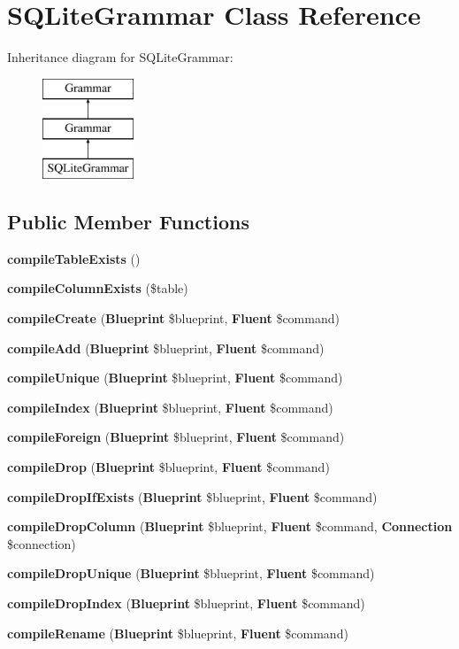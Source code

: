 \section{S\+Q\+Lite\+Grammar Class Reference}
\label{class_illuminate_1_1_database_1_1_schema_1_1_grammars_1_1_s_q_lite_grammar}
Inheritance diagram for S\+Q\+Lite\+Grammar\+:\begin{figure}[H]
\begin{center}
\leavevmode
\includegraphics[height=3.000000cm]{class_illuminate_1_1_database_1_1_schema_1_1_grammars_1_1_s_q_lite_grammar}
\end{center}
\end{figure}
\subsection*{Public Member Functions}
\begin{DoxyCompactItemize}
\item 
{\bf compile\+Table\+Exists} ()
\item 
{\bf compile\+Column\+Exists} (\$table)
\item 
{\bf compile\+Create} ({\bf Blueprint} \$blueprint, {\bf Fluent} \$command)
\item 
{\bf compile\+Add} ({\bf Blueprint} \$blueprint, {\bf Fluent} \$command)
\item 
{\bf compile\+Unique} ({\bf Blueprint} \$blueprint, {\bf Fluent} \$command)
\item 
{\bf compile\+Index} ({\bf Blueprint} \$blueprint, {\bf Fluent} \$command)
\item 
{\bf compile\+Foreign} ({\bf Blueprint} \$blueprint, {\bf Fluent} \$command)
\item 
{\bf compile\+Drop} ({\bf Blueprint} \$blueprint, {\bf Fluent} \$command)
\item 
{\bf compile\+Drop\+If\+Exists} ({\bf Blueprint} \$blueprint, {\bf Fluent} \$command)
\item 
{\bf compile\+Drop\+Column} ({\bf Blueprint} \$blueprint, {\bf Fluent} \$command, {\bf Connection} \$connection)
\item 
{\bf compile\+Drop\+Unique} ({\bf Blueprint} \$blueprint, {\bf Fluent} \$command)
\item 
{\bf compile\+Drop\+Index} ({\bf Blueprint} \$blueprint, {\bf Fluent} \$command)
\item 
{\bf compile\+Rename} ({\bf Blueprint} \$blueprint, {\bf Fluent} \$command)
\end{DoxyCompactItemize}
